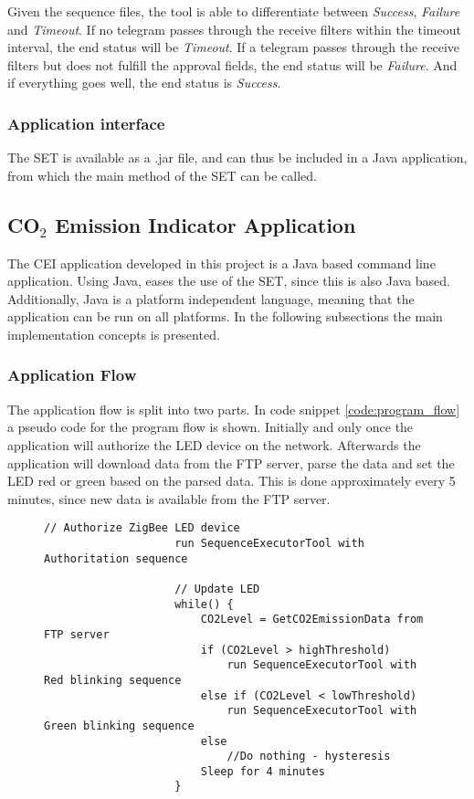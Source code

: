 \documentclass[Main]{subfiles}
\begin{document}
			Given the sequence files, the tool is able to differentiate between \emph{Success}, \emph{Failure} and \emph{Timeout}.
			If no telegram passes through the receive filters within the timeout interval, the end status will be \emph{Timeout}.
			If a telegram passes through the receive filters but does not fulfill the approval fields, the end status will be \emph{Failure}.
			And if everything goes well, the end status is \emph{Success}.

		\subsubsection{Application interface}
			The SET is available as a .jar file, and can thus be included in a Java application, from which the main method of the SET can be called.


	\subsection{CO$_2$ Emission Indicator Application}
		The CEI application developed in this project is a Java based command line application. 
		Using Java, eases the use of the SET, since this is also Java based. 
		Additionally, Java is a platform independent language, meaning that the application can be run on all platforms. 
		In the following subsections the main implementation concepts is presented.

		\subsubsection{Application Flow}
		\label{sub:application_flow}
			The application flow is split into two parts. 
			In code snippet \ref{code:program_flow} a pseudo code for the program flow is shown.
			Initially and only once the application will authorize the LED device on the network.
			Afterwards the application will download data from the FTP server, parse the data and set the LED red or green based on the parsed data.
			This is done approximately every 5 minutes, since new data is available from the FTP server.

			\begin{figure}[H]
				\begin{lstlisting}[caption=Program Flow, style=Code-C, label=code:program_flow]
					// Authorize ZigBee LED device
					run SequenceExecutorTool with Authoritation sequence

					// Update LED
					while() {
						CO2Level = GetCO2EmissionData from FTP server
						if (CO2Level > highThreshold)
							run SequenceExecutorTool with Red blinking sequence
						else if (CO2Level < lowThreshold)
							run SequenceExecutorTool with Green blinking sequence
						else
							//Do nothing - hysteresis
						Sleep for 4 minutes
					}
				\end{lstlisting}
			\end{figure}
				
\end{document}

